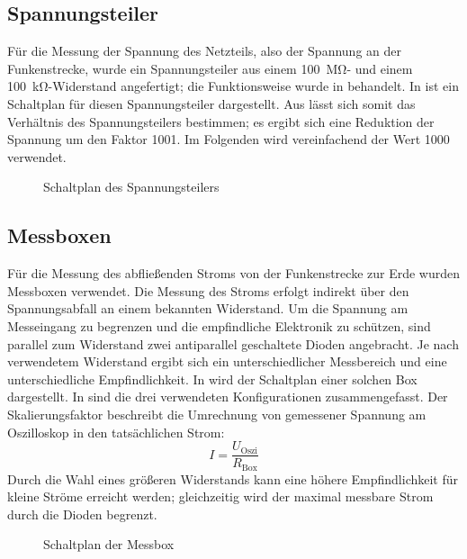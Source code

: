 \subsection{Spannungsteiler}
\label{sec:voltage_divider}
Für die Messung der Spannung des Netzteils, also der Spannung an der Funkenstrecke, wurde ein Spannungsteiler aus einem \SI{100}{\mega\ohm}- und einem \SI{100}{\kilo\ohm}-Widerstand angefertigt; die Funktionsweise wurde in  behandelt. In  ist ein Schaltplan für diesen Spannungsteiler dargestellt. Aus  lässt sich somit das Verhältnis des Spannungsteilers bestimmen; es ergibt sich eine Reduktion der Spannung um den Faktor 1001. Im Folgenden wird vereinfachend der Wert 1000 verwendet.

\begin{figure}[H]
    \centering
    \resizebox{0.5\textwidth}{!}{%
        
    }
    \caption{Schaltplan des Spannungsteilers}
    \label{fig:setup_voltage_divider}
\end{figure}


\subsection{Messboxen}
\label{sec:messbox}
Für die Messung des abfließenden Stroms von der Funkenstrecke zur Erde wurden Messboxen verwendet. Die Messung des Stroms erfolgt indirekt über den Spannungsabfall an einem bekannten Widerstand. Um die Spannung am Messeingang zu begrenzen und die empfindliche Elektronik zu schützen, sind parallel zum Widerstand zwei antiparallel geschaltete Dioden angebracht. Je nach verwendetem Widerstand ergibt sich ein unterschiedlicher Messbereich und eine unterschiedliche Empfindlichkeit. In  wird der Schaltplan einer solchen Box dargestellt. In  sind die drei verwendeten Konfigurationen zusammengefasst. Der Skalierungsfaktor beschreibt die Umrechnung von gemessener Spannung am Oszilloskop in den tatsächlichen Strom:
\begin{equation}
  I = \frac{U_{\text{Oszi}}}{R_{\text{Box}}}
\end{equation}
Durch die Wahl eines größeren Widerstands kann eine höhere Empfindlichkeit für kleine Ströme erreicht werden; gleichzeitig wird der maximal messbare Strom durch die Dioden begrenzt.

\begin{figure}[H]
    \centering
    \resizebox{0.5\textwidth}{!}{%
        
    }
    \caption{Schaltplan der Messbox}
    \label{fig:setup_box}
\end{figure}

